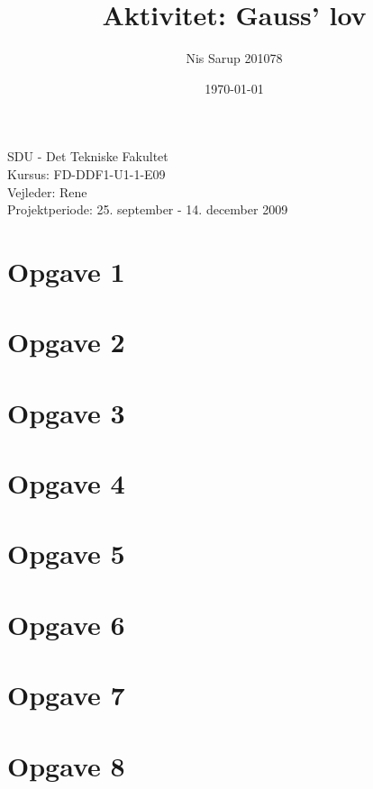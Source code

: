 \documentclass[a4wide,10pt]{article}
\begin{document}
\title{Aktivitet: Gauss’ lov}
\author{Nis Sarup 201078}
\date{\today}
\maketitle
\begin{center}
	SDU - Det Tekniske Fakultet\\
	Kursus: FD-DDF1-U1-1-E09\\
	Vejleder: Rene \\
	Projektperiode: 25. september - 14. december 2009\\
\end{center}
\newpage

\section{Opgave 1} %
\label{sec:opgave_1}

\newpage

\section{Opgave 2} %
\label{sec:opgave_2}


\section{Opgave 3} %
\label{sec:opgave_3}


\section{Opgave 4} %
\label{sec:opgave_4}

\newpage

\section{Opgave 5} %
\label{sec:opgave_5}


\section{Opgave 6} %
\label{sec:opgave_6}


\section{Opgave 7} %
\label{sec:opgave_7}

\newpage

\section{Opgave 8} %
\label{sec:opgave_8}

\end{document}
